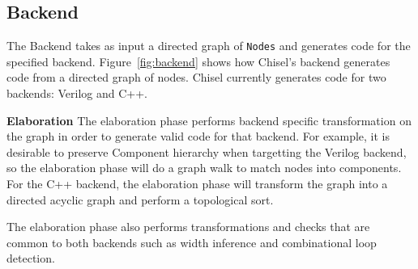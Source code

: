 \subsection{Backend}
The Backend takes as input a directed graph of {\tt Nodes} and
generates code for the specified backend. Figure~\ref{fig:backend}
shows how Chisel's backend generates code from a directed graph of
nodes. Chisel currently generates code for two backends: Verilog and C++.

{\bf Elaboration} The elaboration phase performs backend specific
transformation on the graph in order to generate valid code for that
backend. For example, it is desirable to preserve Component hierarchy
when targetting the Verilog backend, so the elaboration phase will do a
graph walk to match nodes into components. For the C++ backend, the
elaboration phase will transform the graph into a directed acyclic
graph and perform a topological sort.

The elaboration phase also performs transformations and checks that
are common to both backends such as width inference and combinational
loop detection.

